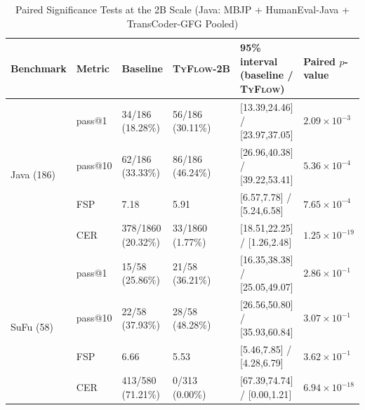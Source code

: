 \documentclass[manuscript,screen]{acmart}
\newcommand{\toolname}[1]{\textsc{#1}}
\newcommand{\mainname}{\toolname{TyFlow}\xspace}
\begin{document}
\begin{table}[ht]
\centering
\small
\begin{threeparttable}
\caption{{\color{revblue}Paired Significance Tests at the 2B Scale (Java: MBJP + HumanEval-Java + TransCoder-GFG Pooled)}}
\label{tab:paired-statistics-2b}
\begin{tabular}{l l l l l l}
\toprule
{\color{revblue}Benchmark }& {\color{revblue}Metric }& {\color{revblue}Baseline }& \mainname{\color{revblue}-2B }& {\color{revblue}95\% interval (baseline / }\mainname{\color{revblue}) }& {\color{revblue}Paired $p$-value }\\
\midrule
\multirow{4}{*}{Java (186)}
 & {\color{revblue}pass@1  }& {\color{revblue}34/186 (18.28\%) }& {\color{revblue}56/186 (30.11\%) }& [{\color{revblue}13.39,24.46}] {\color{revblue}/ }[{\color{revblue}23.97,37.05}] & {\color{revblue}$2.09{\times}10^{-3}$ }\\
 & {\color{revblue}pass@10 }& {\color{revblue}62/186 (33.33\%) }& {\color{revblue}86/186 (46.24\%) }& [{\color{revblue}26.96,40.38}] {\color{revblue}/ }[{\color{revblue}39.22,53.41}] & {\color{revblue}$5.36{\times}10^{-4}$ }\\
 & {\color{revblue}FSP     }& {\color{revblue}7.18             }& {\color{revblue}5.91             }& [{\color{revblue}6.57,7.78}] {\color{revblue}/ }[{\color{revblue}5.24,6.58}]     & {\color{revblue}$7.65{\times}10^{-4}$ }\\
 & {\color{revblue}CER     }& {\color{revblue}378/1860 (20.32\%) }& {\color{revblue}33/1860 (1.77\%) }& [{\color{revblue}18.51,22.25}] {\color{revblue}/ }[{\color{revblue}1.26,2.48}]  & {\color{revblue}$1.25{\times}10^{-19}$ }\\
\midrule
\multirow{4}{*}{SuFu (58)}
 & {\color{revblue}pass@1  }& {\color{revblue}15/58 (25.86\%) }& {\color{revblue}21/58 (36.21\%) }& [{\color{revblue}16.35,38.38}] {\color{revblue}/ }[{\color{revblue}25.05,49.07}] & {\color{revblue}$2.86{\times}10^{-1}$ }\\
 & {\color{revblue}pass@10 }& {\color{revblue}22/58 (37.93\%) }& {\color{revblue}28/58 (48.28\%) }& [{\color{revblue}26.56,50.80}] {\color{revblue}/ }[{\color{revblue}35.93,60.84}] & {\color{revblue}$3.07{\times}10^{-1}$ }\\
 & {\color{revblue}FSP     }& {\color{revblue}6.66            }& {\color{revblue}5.53            }& [{\color{revblue}5.46,7.85}] {\color{revblue}/ }[{\color{revblue}4.28,6.79}]      & {\color{revblue}$3.62{\times}10^{-1}$ }\\
 & {\color{revblue}CER     }& {\color{revblue}413/580 (71.21\%) }& {\color{revblue}0/313 (0.00\%) }& [{\color{revblue}67.39,74.74}] {\color{revblue}/ }[{\color{revblue}0.00,1.21}]    & {\color{revblue}$6.94{\times}10^{-18}$ }\\
\bottomrule
\end{tabular}
\end{threeparttable}
\end{table}

 
\end{document}
